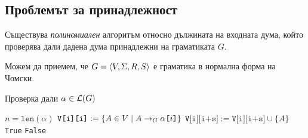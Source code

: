 \subsection{Проблемът за принадлежност}

\begin{theorem}
  Съществува {\em полиномиален} алгоритъм относно дължината на входната дума, който проверява дали дадена дума принадлежни на граматиката $G$.
\end{theorem}
Можем да приемем, че $G = \langle{V,\Sigma,R,S}\rangle$ е граматика в нормална форма на Чомски.
\begin{algorithm}[H]
  \caption{Проверка дали $\alpha \in \mathcal{L}(G)$}
  \label{alg:belongs-to-grammar}
  \begin{algorithmic}[1]
    \State $n = \texttt{len}(\alpha)$ 
    \State $\texttt{V[i][i]} := \{A \in V \mid A\to_G \alpha\texttt{[}{i}\texttt{]}\}$ \label{alg:cyk:initial}
    \EndFor
    \EndFor
    \ForAll{$s \in [1, n)$}  \label{alg:cyk:first-loop}
    \ForAll{$k \in [i, i + s)$}
    \State $\texttt{V[i][i+s]} := \texttt{V[i][i+s]} \cup \{A\}$ \label{alg:cyk:add-variable}
    \EndIf
    \EndFor
    \EndFor
    \EndFor
    \State \Return \texttt{True}
    \Else
    \State \Return \texttt{False}
    \EndIf
  \end{algorithmic}
\end{algorithm}

